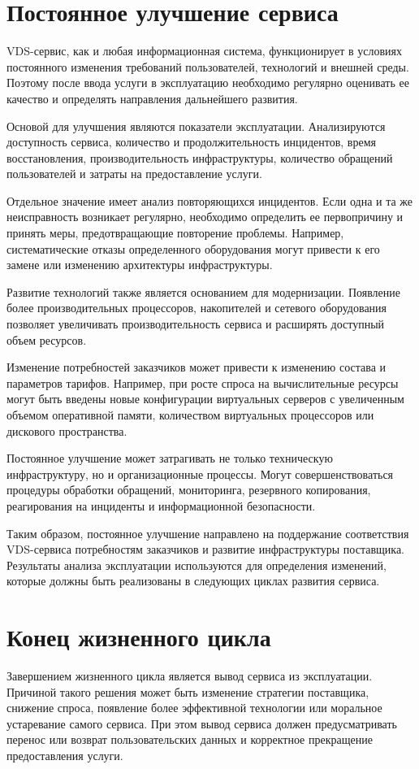 \documentclass[14pt,a4paper]{extarticle}
\begin{document}
    \section{Постоянное улучшение сервиса}

    VDS-сервис, как и любая информационная система, функционирует в условиях
    постоянного изменения требований пользователей, технологий и внешней среды.
    Поэтому после ввода услуги в эксплуатацию необходимо регулярно оценивать ее
    качество и определять направления дальнейшего развития.

    Основой для улучшения являются показатели эксплуатации. Анализируются
    доступность сервиса, количество и продолжительность инцидентов, время
    восстановления, производительность инфраструктуры, количество обращений
    пользователей и затраты на предоставление услуги.

    Отдельное значение имеет анализ повторяющихся инцидентов. Если одна и та же
    неисправность возникает регулярно, необходимо определить ее первопричину и
    принять меры, предотвращающие повторение проблемы. Например, систематические
    отказы определенного оборудования могут привести к его замене или изменению
    архитектуры инфраструктуры.

    Развитие технологий также является основанием для модернизации. Появление более
    производительных процессоров, накопителей и сетевого оборудования позволяет
    увеличивать производительность сервиса и расширять доступный объем ресурсов.

    Изменение потребностей заказчиков может привести к изменению состава и
    параметров тарифов. Например, при росте спроса на вычислительные ресурсы могут
    быть введены новые конфигурации виртуальных серверов с увеличенным объемом
    оперативной памяти, количеством виртуальных процессоров или дискового
    пространства.

    Постоянное улучшение может затрагивать не только техническую инфраструктуру, но
    и организационные процессы. Могут совершенствоваться процедуры обработки
    обращений, мониторинга, резервного копирования, реагирования на инциденты и
    информационной безопасности.

    Таким образом, постоянное улучшение направлено на поддержание соответствия
    VDS-сервиса потребностям заказчиков и развитие инфраструктуры поставщика.
    Результаты анализа эксплуатации используются для определения изменений, которые
    должны быть реализованы в следующих циклах развития сервиса.

    \newpage

    \section{Конец жизненного цикла}

    Завершением жизненного цикла является вывод сервиса из эксплуатации. Причиной
    такого решения может быть изменение стратегии поставщика, снижение спроса,
    появление более эффективной технологии или моральное устаревание самого
    сервиса. При этом вывод сервиса должен предусматривать перенос или возврат
    пользовательских данных и корректное прекращение предоставления услуги.

    
\end{document}
